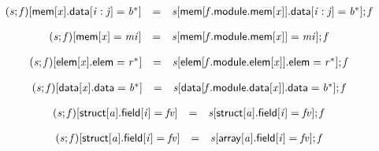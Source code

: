 $$
\begin{array}{@{}lcl@{}l@{}}
({\mathit{s}} ; {\mathit{f}})[\mathsf{mem}[{\mathit{x}}].\mathsf{data}[{\mathit{i}} : {\mathit{j}}] = {{\mathit{b}}^\ast}] &=& {\mathit{s}}[\mathsf{mem}[{\mathit{f}}.\mathsf{module}.\mathsf{mem}[{\mathit{x}}]].\mathsf{data}[{\mathit{i}} : {\mathit{j}}] = {{\mathit{b}}^\ast}] ; {\mathit{f}} &  \\
\end{array}
$$

$$
\begin{array}{@{}lcl@{}l@{}}
({\mathit{s}} ; {\mathit{f}})[\mathsf{mem}[{\mathit{x}}] = {\mathit{mi}}] &=& {\mathit{s}}[\mathsf{mem}[{\mathit{f}}.\mathsf{module}.\mathsf{mem}[{\mathit{x}}]] = {\mathit{mi}}] ; {\mathit{f}} &  \\
\end{array}
$$

$$
\begin{array}{@{}lcl@{}l@{}}
({\mathit{s}} ; {\mathit{f}})[\mathsf{elem}[{\mathit{x}}].\mathsf{elem} = {{\mathit{r}}^\ast}] &=& {\mathit{s}}[\mathsf{elem}[{\mathit{f}}.\mathsf{module}.\mathsf{elem}[{\mathit{x}}]].\mathsf{elem} = {{\mathit{r}}^\ast}] ; {\mathit{f}} &  \\
\end{array}
$$

$$
\begin{array}{@{}lcl@{}l@{}}
({\mathit{s}} ; {\mathit{f}})[\mathsf{data}[{\mathit{x}}].\mathsf{data} = {{\mathit{b}}^\ast}] &=& {\mathit{s}}[\mathsf{data}[{\mathit{f}}.\mathsf{module}.\mathsf{data}[{\mathit{x}}]].\mathsf{data} = {{\mathit{b}}^\ast}] ; {\mathit{f}} &  \\
\end{array}
$$

$$
\begin{array}{@{}lcl@{}l@{}}
({\mathit{s}} ; {\mathit{f}})[\mathsf{struct}[{\mathit{a}}].\mathsf{field}[{\mathit{i}}] = {\mathit{fv}}] &=& {\mathit{s}}[\mathsf{struct}[{\mathit{a}}].\mathsf{field}[{\mathit{i}}] = {\mathit{fv}}] ; {\mathit{f}} &  \\
\end{array}
$$

$$
\begin{array}{@{}lcl@{}l@{}}
({\mathit{s}} ; {\mathit{f}})[\mathsf{struct}[{\mathit{a}}].\mathsf{field}[{\mathit{i}}] = {\mathit{fv}}] &=& {\mathit{s}}[\mathsf{array}[{\mathit{a}}].\mathsf{field}[{\mathit{i}}] = {\mathit{fv}}] ; {\mathit{f}} &  \\
\end{array}
$$

